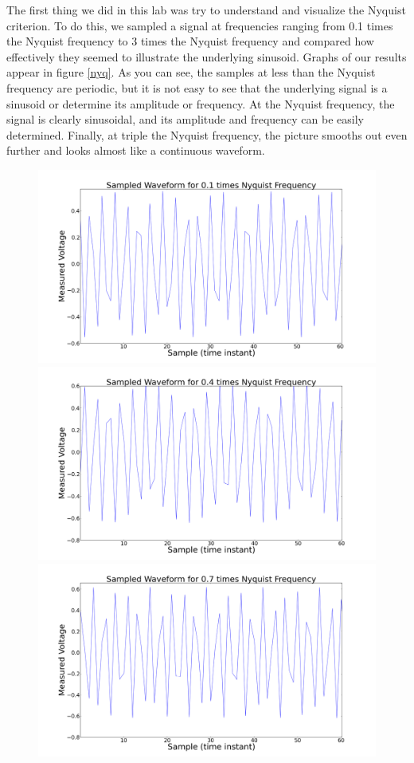 \documentclass[11pt]{article}
\begin{document}
The first thing we did in this lab was try to understand and visualize
the Nyquist criterion. To do this, we sampled a signal at frequencies
ranging from 0.1 times the Nyquist frequency to 3 times the Nyquist
frequency and compared how effectively they seemed to illustrate the
underlying sinusoid. Graphs of our results appear in figure \ref{nyq}.
As you can see, the samples at less than the Nyquist frequency are
periodic, but it is not easy to see that the underlying signal is a
sinusoid or determine its amplitude or frequency. At the Nyquist frequency, the
signal is clearly sinusoidal, and its amplitude and frequency can be
easily determined. Finally, at triple the Nyquist frequency, the picture
smooths out even further and looks almost like a continuous waveform. 
\begin{figure}
\centering
\includegraphics[scale=0.15]{pictures/pointonenyq}
\includegraphics[scale=0.15]{pictures/pointfournyq}
\includegraphics[scale=0.15]{pictures/pointsevennyq}

\end{figure}
\end{document}
